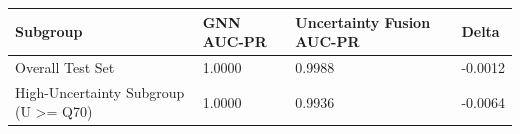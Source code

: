 \begin{tabular}{llll}
\toprule
Subgroup & GNN AUC-PR & Uncertainty Fusion AUC-PR & Delta \\
\midrule
Overall Test Set & 1.0000 & 0.9988 & -0.0012 \\
High-Uncertainty Subgroup (U >= Q70) & 1.0000 & 0.9936 & -0.0064 \\
\bottomrule
\end{tabular}
